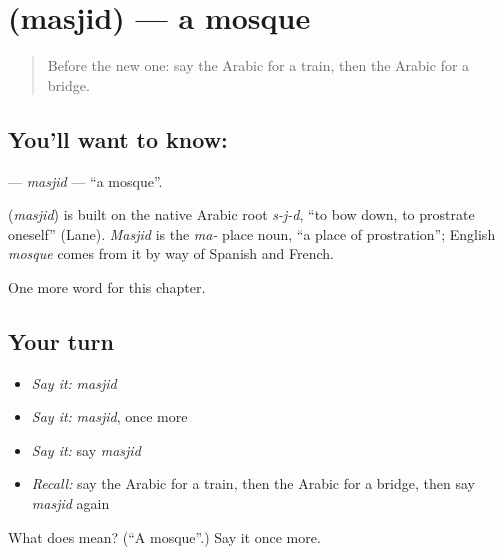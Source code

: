 \section[\texorpdfstring{\ar{مسجد} (masjid)}{مسجد (masjid)}]{ (masjid) — a mosque}

\label{lesson:AR-C92-masjid}



\begin{quote}
Before the new one: say the Arabic for a train, then the Arabic for a bridge.
\end{quote}

\subsection*{You'll want to know: }
\textbf{} — \emph{masjid} — \textquotedblleft{}a mosque\textquotedblright{}.

\begin{cousinweb}
\textbf{} (\emph{masjid}) is built on the native Arabic root \emph{s-j-d}, \textquotedblleft{}to bow down, to prostrate oneself\textquotedblright{} (Lane). \emph{Masjid} is the \emph{ma-} place noun, \textquotedblleft{}a place of prostration\textquotedblright{}; English \emph{mosque} comes from it by way of Spanish and French.
\end{cousinweb}

\begin{grammarlens}[title={What you've built}]
One more word for this chapter.
\end{grammarlens}

\subsection*{Your turn}
\begin{itemize}
\raggedright
  \item \emph{Say it:} \emph{masjid}
  \item \emph{Say it:} \emph{masjid}, once more
  \item \emph{Say it:} say \emph{masjid}
  \item \emph{Recall:} say the Arabic for a train, then the Arabic for a bridge, then say \emph{masjid} again
\end{itemize}

\begin{tcolorbox}[breakable,colback=teal!4,colframe=teal!35!black,title={Before you move on}]
What does  mean? (\textquotedblleft{}A mosque\textquotedblright{}.) Say it once more.
\end{tcolorbox}
